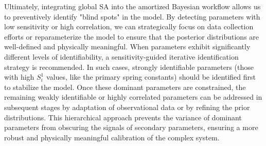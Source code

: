 Ultimately, integrating global \ac{SA} into the amortized Bayesian workflow allows us to preventively identify "blind spots" in the model. By detecting parameters with low sensitivity or high correlation, we can strategically focus on data collection efforts or reparameterize the model to ensure that the posterior distributions are well-defined and physically meaningful. When parameters exhibit significantly different levels of identifiability, a sensitivity-guided iterative identification strategy is recommended. In such cases, strongly identifiable parameters (those with high $S^1_i$ values, like the primary spring constants) should be identified first to stabilize the model. Once these dominant parameters are constrained, the remaining weakly identifiable or highly correlated parameters can be addressed in subsequent stages by adaptation of observational data or by refining the prior distributions. This hierarchical approach prevents the variance of dominant parameters from obscuring the signals of secondary parameters, ensuring a more robust and physically meaningful calibration of the complex system.

